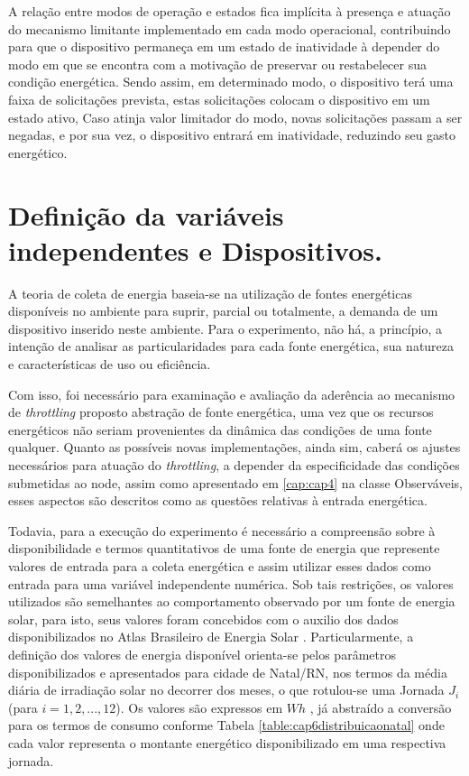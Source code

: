 A relação entre modos de operação e estados fica implícita à presença e atuação do mecanismo limitante implementado em cada modo operacional, contribuindo para que o dispositivo permaneça em um estado de inatividade à depender do modo em que se encontra com a motivação de preservar ou restabelecer sua condição energética. Sendo assim, em determinado modo, o dispositivo terá uma faixa de solicitações prevista, estas solicitações colocam o dispositivo em um estado ativo, Caso atinja valor limitador do modo, novas solicitações passam a ser negadas, e por sua vez, o dispositivo entrará em inatividade, reduzindo seu gasto energético.







\section{Definição da variáveis independentes e Dispositivos.}

A teoria de coleta de energia baseia-se na utilização de fontes energéticas disponíveis no ambiente para suprir, parcial ou totalmente, a demanda de um dispositivo inserido neste ambiente. Para o experimento, não há, a princípio, a intenção de analisar as particularidades para cada fonte energética, sua natureza e características de uso ou eficiência. 

Com isso, foi necessário para examinação e avaliação da aderência ao mecanismo de \textit{throttling} proposto abstração de fonte energética, uma vez que os recursos energéticos não seriam provenientes da dinâmica das condições de uma fonte qualquer. Quanto as possíveis novas implementações, ainda sim, caberá os ajustes necessários para atuação do \textit{throttling},  a depender da especificidade das condições submetidas ao node, assim como apresentado em \ref{cap:cap4} na classe Observáveis, esses aspectos são descritos como as questões relativas à entrada energética. 

Todavia, para a execução do experimento é necessário a compreensão sobre à disponibilidade e termos quantitativos de uma fonte de energia que represente valores de entrada para a coleta energética e assim utilizar esses dados como entrada para uma variável independente numérica. Sob tais restrições, os valores utilizados são semelhantes ao comportamento observado por um fonte de energia solar, para isto, seus valores foram concebidos com o auxilio dos dados disponibilizados no Atlas Brasileiro de Energia Solar \cite{martins2017atlas}. Particularmente, a definição dos valores de energia disponível orienta-se pelos parâmetros disponibilizados e apresentados para cidade de Natal/RN, nos termos da média diária de irradiação solar no decorrer  dos meses, o que rotulou-se uma Jornada $J_i$ (para $i = 1,2,...,12$). Os valores são expressos em  $Wh$ , já abstraído a conversão para os termos de consumo conforme Tabela \ref{table:cap6distribuicaonatal} onde cada valor representa o montante energético disponibilizado em uma respectiva jornada.


